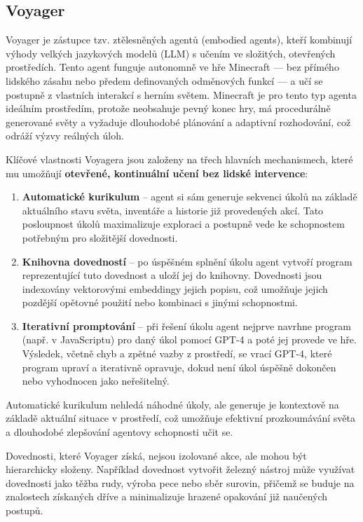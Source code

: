\newpage

\subsection{Voyager}

Voyager\cite{Wangbr} je zástupce tzv. ztělesněných agentů (embodied agents), kteří kombinují výhody velkých jazykových modelů (LLM) s učením ve složitých, otevřených prostředích. Tento agent funguje autonomně ve hře Minecraft — bez přímého lidského zásahu nebo předem definovaných odměnových funkcí — a učí se postupně z vlastních interakcí s herním světem. Minecraft je pro tento typ agenta ideálním prostředím, protože neobsahuje pevný konec hry, má procedurálně generované světy a vyžaduje dlouhodobé plánování a adaptivní rozhodování, což odráží výzvy reálných úloh.

Klíčové vlastnosti Voyagera jsou založeny na třech hlavních mechanismech, které mu umožňují \textbf{otevřené, kontinuální učení bez lidské intervence}:

\begin{enumerate}
    \item \textbf{Automatické kurikulum} – agent si sám generuje sekvenci úkolů na základě aktuálního stavu světa, inventáře a historie již provedených akcí. Tato posloupnost úkolů maximalizuje exploraci a postupně vede ke schopnostem potřebným pro složitější dovednosti.
    \item \textbf{Knihovna dovedností} – po úspěšném splnění úkolu agent vytvoří program reprezentující tuto dovednost a uloží jej do knihovny. Dovednosti jsou indexovány vektorovými embeddingy jejich popisu, což umožňuje jejich pozdější opětovné použití nebo kombinaci s jinými schopnostmi.
    \item \textbf{Iterativní promptování} – při řešení úkolu agent nejprve navrhne program (např. v JavaScriptu) pro daný úkol pomocí GPT-4 a poté jej provede ve hře. Výsledek, včetně chyb a zpětné vazby z prostředí, se vrací GPT-4, které program upraví a iterativně opravuje, dokud není úkol úspěšně dokončen nebo vyhodnocen jako neřešitelný.
\end{enumerate}

Automatické kurikulum nehledá náhodné úkoly, ale generuje je kontextově na základě aktuální situace v prostředí, což umožňuje efektivní prozkoumávání světa a dlouhodobé zlepšování agentovy schopnosti učit se.

Dovednosti, které Voyager získá, nejsou izolované akce, ale mohou být hierarchicky složeny. Například dovednost vytvořit železný nástroj může využívat dovednosti jako těžba rudy, výroba pece nebo sběr surovin, přičemž se buduje na znalostech získaných dříve a minimalizuje hrazené opakování již naučených postupů.

